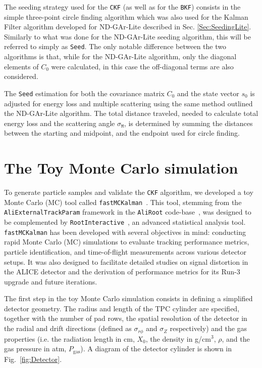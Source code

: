 The seeding strategy used for the \texttt{CKF} (as well as for the \texttt{BKF}) consists in the simple three-point circle finding algorithm which was also used for the Kalman Filter algorithm developed for ND-GAr-Lite described in Sec. \ref{Sec:SeedingLite}. Similarly to what was done for the ND-GAr-Lite seeding algorithm, this will be referred to simply as \texttt{Seed}. The only notable difference between the two algorithms is that, while for the ND-GAr-Lite algorithm, only the diagonal elements of $C_0$ were calculated, in this case the off-diagonal terms are also considered. 

The \texttt{Seed} estimation for both the covariance matrix $C_0$ and the state vector $s_0$ is adjusted for energy loss and multiple scattering using the same method outlined the ND-GAr-Lite algorithm. The total distance traveled, needed to calculate total energy loss and the scattering angle $\sigma_\texttt{M}$, is determined by summing the distances between the starting and midpoint, and the endpoint used for circle finding.

\section{The Toy Monte Carlo simulation}
\label{sec:fastMCKalman}

To generate particle samples and validate the \texttt{CKF} algorithm, we developed a toy Monte Carlo (MC) tool called \texttt{fastMCKalman}~\cite{fastMCKalman}. This tool, stemming from the \texttt{AliExternalTrackParam} framework in the \texttt{AliRoot} code-base~\cite{aliroot}, was designed to be complemented by \texttt{RootInteractive}~\cite{RootInt}, an advanced statistical analysis tool. \texttt{fastMCKalman} has been developed with several objectives in mind: conducting rapid Monte Carlo (MC) simulations to evaluate tracking performance metrics, particle identification, and time-of-flight measurements across various detector setups. It was also designed to facilitate detailed studies on signal distortion in the ALICE detector and the derivation of performance metrics for its Run-3 upgrade and future iterations. 

The first step in the toy Monte Carlo simulation consists in defining a simplified detector geometry. The radius and length of the TPC cylinder are specified, together with the number of pad rows, the spatial resolution of the detector in the radial and drift directions (defined as $\sigma_{r\phi}$ and $\sigma_Z$ respectively) and the gas properties (i.e. the radiation length in cm, $X_0$, the density in g/cm$^3$, $\rho$, and the gas pressure in atm, $P_\textrm{gas}$). A diagram of the detector cylinder is shown in Fig.~\ref{fig:Detector}. 

